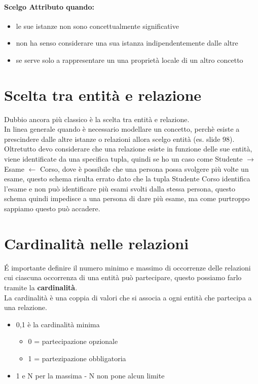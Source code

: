 \paragraph*{Scelgo Attributo quando:}
\begin{itemize}
    \item le sue istanze non sono concettualmente significative
    \item non ha senso considerare una sua istanza indipendentemente dalle altre
    \item se serve solo a rappresentare un una proprietà locale di un altro concetto
\end{itemize}
\section{Scelta tra entità e relazione}
Dubbio ancora più classico è la scelta tra entità e relazione.
\\ In linea generale quando è necessario modellare un concetto, perchè esiste
a prescindere dalle altre istanze o relazioni allora scelgo entità (es. slide 98).
Oltretutto devo considerare che una relazione esiste in funzione delle sue entità,
viene identificate da una specifica tupla, quindi se ho un caso 
come Studente $\rightarrow$ Esame $\leftarrow$ Corso, dove è possibile che una
persona possa svolgere più volte un esame, questo schema risulta errato dato
che la tupla Studente Corso identifica l'esame e non può identificare più esami svolti 
dalla stessa persona, questo schema quindi impedisce a una persona di dare più esame,
ma come purtroppo sappiamo questo può accadere.
\section{Cardinalità nelle relazioni}
\'E importante definire il numero minimo e massimo di occorrenze delle relazioni cui
ciascuna occorrenza di una entità può partecipare, questo possiamo farlo tramite
la \textbf{cardinalità}.
\\ La cardinalità è una coppia di valori che si associa a ogni entità che partecipa a una
relazione.
\begin{itemize}
    \item 0,1 è la cardinalità minima \begin{itemize}
        \item 0 = partecipazione opzionale
        \item 1 = partezipazione obbligatoria
    \end{itemize}
    \item 1 e N per la massima - N non pone alcun limite
\end{itemize}
